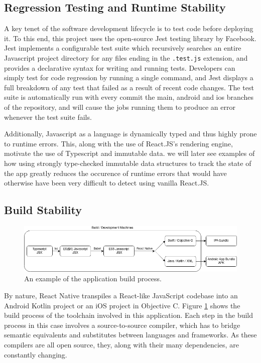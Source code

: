\subsection{Regression Testing and Runtime Stability}
A key tenet of the software development lifecycle is to test code before deploying it. To this end, this project uses the open-source Jest testing library by Facebook. Jest implements a configurable test suite which recursively searches an entire Javascript project directory for any files ending in the \texttt{.test.js} extension, and provides a declarative syntax for writing and running tests. Developers can simply test for code regression by running a single command, and Jest displays a full breakdown of any test that failed as a result of recent code changes. The test suite is automatically run with every commit the main, android and ios branches of the repository, and will cause the jobs running them to produce an error whenever the test suite fails.

Additionally, Javascript as a language is dynamically typed and thus highly prone to runtime errors. This, along with the use of React.JS's rendering engine, motivate the use of Typescript and immutable data. we will later see examples of how using strongly type-checked immutable data structures to track the state of the app greatly reduces the occurence of runtime errors that would have otherwise have been very difficult to detect using vanilla React.JS.


\subsection{Build Stability}
\begin{figure}[h]
    \begin{center}
        \includegraphics[scale=0.55]{images/app_build_path.png}
    \end{center}
    \caption{An example of the application build process.}
    \label{fig:app_build_process}
\end{figure}

By nature, React Native transpiles a React-like JavaScript codebase into an Android Kotlin project or an iOS project in Objective C. Figure \ref{fig:app_build_process} shows the build process of the toolchain involved in this application. Each step in the build process in this case involves a source-to-source compiler, which has to bridge semantic equivalents and substitutes between languages and frameworks. As these compilers are all open source, they, along with their many dependencies, are constantly changing.

